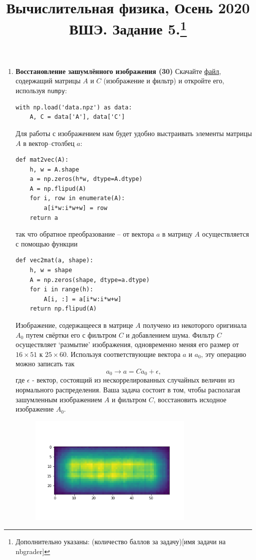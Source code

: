 \documentclass[prb,papersize=a4paper,notitlepage]{revtex4-1}%
\begin{document}
\title{Вычислительная физика, Осень 2020 ВШЭ. Задание 5.\footnote{Дополнительно указаны: (количество баллов за задачу)[имя задачи на nbgrader]}}
\maketitle
\begin{enumerate}
\item \textbf{Восстановление зашумлённого изображения (30)} Скачайте \href{https://www.dropbox.com/s/qgz1x67t10fd7hf/data.npz?dl=0}{файл}, содержащий матрицы $A$ и $C$ (изображение и фильтр) и откройте его, используя \lstinline{numpy}:
\lstset{language=Python}
\lstset{frame=lines}
\lstset{basicstyle=\ttfamily}
\begin{lstlisting}
with np.load('data.npz') as data:
    A, C = data['A'], data['C']
\end{lstlisting}
Для работы с изображением нам будет удобно выстраивать элементы матрицы $A$ в вектор--столбец $a$:
\lstset{language=Python}
\lstset{frame=lines}
\lstset{basicstyle=\ttfamily}
\begin{lstlisting}
def mat2vec(A):
    h, w = A.shape
    a = np.zeros(h*w, dtype=A.dtype)
    A = np.flipud(A) 
    for i, row in enumerate(A):
        a[i*w:i*w+w] = row
    return a
\end{lstlisting}
так что обратное преобразование -- от вектора $a$ в матрицу $A$ осуществляется с помощью функции
\lstset{language=Python}
\lstset{frame=lines}
\lstset{basicstyle=\ttfamily}
\begin{lstlisting}
def vec2mat(a, shape):
    h, w = shape
    A = np.zeros(shape, dtype=a.dtype)
    for i in range(h):
        A[i, :] = a[i*w:i*w+w]
    return np.flipud(A)
\end{lstlisting}
Изображение, содержащееся в матрице $A$ получено из некоторого оригинала $A_0$ путем свёртки его с фильтром $C$ и добавлением шума. Фильтр $C$ осуществляет `размытие' изображения, одновременно меняя его размер от $16\times 51$ к $25\times 60$. Используя соответствующие вектора $a$ и $a_0$, эту операцию можно записать так
$$
a_0\to a = C a_0 + \epsilon,
$$
где $\epsilon$ - вектор, состоящий из нескоррелированных случайных величин из нормального распределения. Ваша задача состоит в том, чтобы располагая зашумленным изображением $A$ и фильтром $C$, восстановить исходное изображение $A_0$.
\begin{figure}[h!]
\includegraphics[width=8cm]{im.png}

\end{figure}
\end{enumerate}
\end{document}
